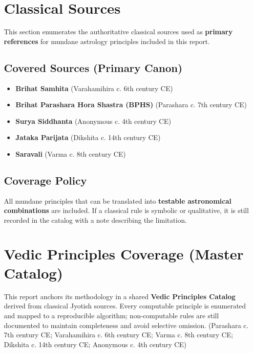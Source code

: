 \documentclass[
  11pt,
  a4paper,
  oneside,
  openany]{article}
\providecommand{\tightlist}{%
  \setlength{\itemsep}{0pt}\setlength{\parskip}{0pt}}\usepackage{longtable,booktabs,array}
\begin{document}
\section{Classical Sources}\label{classical-sources}

This section enumerates the authoritative classical sources used as
\textbf{primary references} for mundane astrology principles included in
this report.

\subsection{Covered Sources (Primary
Canon)}\label{covered-sources-primary-canon}

\begin{itemize}
\tightlist
\item
  \textbf{Brihat Samhita} (Varahamihira c. 6th century CE)
\item
  \textbf{Brihat Parashara Hora Shastra (BPHS)} (Parashara c. 7th
  century CE)
\item
  \textbf{Surya Siddhanta} (Anonymous c. 4th century CE)
\item
  \textbf{Jataka Parijata} (Dikshita c. 14th century CE)
\item
  \textbf{Saravali} (Varma c. 8th century CE)
\end{itemize}

\subsection{Coverage Policy}\label{coverage-policy}

All mundane principles that can be translated into \textbf{testable
astronomical combinations} are included. If a classical rule is symbolic
or qualitative, it is still recorded in the catalog with a note
describing the limitation.

\section{Vedic Principles Coverage (Master
Catalog)}\label{vedic-principles-coverage-master-catalog}

This report anchors its methodology in a shared \textbf{Vedic Principles
Catalog} derived from classical Jyotish sources. Every computable
principle is enumerated and mapped to a reproducible algorithm;
non-computable rules are still documented to maintain completeness and
avoid selective omission. (Parashara c. 7th century CE; Varahamihira c.
6th century CE; Varma c. 8th century CE; Dikshita c. 14th century CE;
Anonymous c. 4th century CE)
\end{document}
